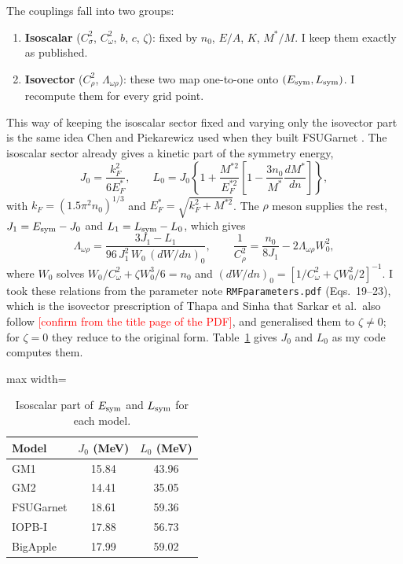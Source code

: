 \documentclass[11pt,a4paper]{article}
\newcommand{\fillin}[1]{\textcolor{red}{[#1]}}
\newcommand{\Esym}{E_{\rm sym}}
\newcommand{\Lsym}{L_{\rm sym}}
\begin{document}
The couplings fall into two groups:
\begin{enumerate}
\item \textbf{Isoscalar} ($C_\sigma^2$, $C_\omega^2$, $b$, $c$, $\zeta$): fixed by $n_0$, $E/A$, $K$, $M^*/M$. I keep them exactly as published.
\item \textbf{Isovector} ($C_\rho^2$, $\Lambda_{\omega\rho}$): these two map one-to-one onto $(\Esym,\Lsym)$. I recompute them for every grid point.
\end{enumerate}
This way of keeping the isoscalar sector fixed and varying only the isovector part is the same idea Chen and Piekarewicz used when they built FSUGarnet \cite{FSUGarnet}. The isoscalar sector already gives a kinetic part of the symmetry energy,
\begin{equation}
J_0 = \frac{k_F^2}{6E_F^*},\qquad
L_0 = J_0\left\{1+\frac{M^{*2}}{E_F^{*2}}\left[1-\frac{3n_0}{M^*}\frac{dM^*}{dn}\right]\right\},
\end{equation}
with $k_F=(1.5\pi^2 n_0)^{1/3}$ and $E_F^*=\sqrt{k_F^2+M^{*2}}$. The $\rho$ meson supplies the rest, $J_1=\Esym-J_0$ and $L_1=\Lsym-L_0$, which gives
\begin{equation}
\Lambda_{\omega\rho} = \frac{3J_1-L_1}{96\,J_1^2\,W_0\,(dW/dn)_0},\qquad
\frac{1}{C_\rho^2} = \frac{n_0}{8J_1} - 2\Lambda_{\omega\rho}W_0^2,
\end{equation}
where $W_0$ solves $W_0/C_\omega^2+\zeta W_0^3/6=n_0$ and $(dW/dn)_0=[1/C_\omega^2+\zeta W_0^2/2]^{-1}$. I took these relations from the parameter note \texttt{RMFparameters.pdf} (Eqs.~19--23), which is the isovector prescription of Thapa and Sinha \cite{ThapaSinha2022} that Sarkar et al.\ also follow \cite{Sarkar2023} \fillin{confirm from the title page of the PDF}, and generalised them to $\zeta\neq0$; for $\zeta=0$ they reduce to the original form. Table~\ref{tab:J0L0} gives $J_0$ and $L_0$ as my code computes them.

\begin{table}[h]
\centering
\caption{Isoscalar part of $\Esym$ and $\Lsym$ for each model.}\label{tab:J0L0}
\begin{adjustbox}{max width=\linewidth}
\begin{tabular}{lcc}
\toprule
Model & $J_0$ (MeV) & $L_0$ (MeV)\\
\midrule
GM1 & 15.84 & 43.96\\
GM2 & 14.41 & 35.05\\
FSUGarnet & 18.61 & 59.36\\
IOPB-I & 17.88 & 56.73\\
BigApple & 17.99 & 59.02\\
\bottomrule
\end{tabular}
\end{adjustbox}
\end{table}
\end{document}
